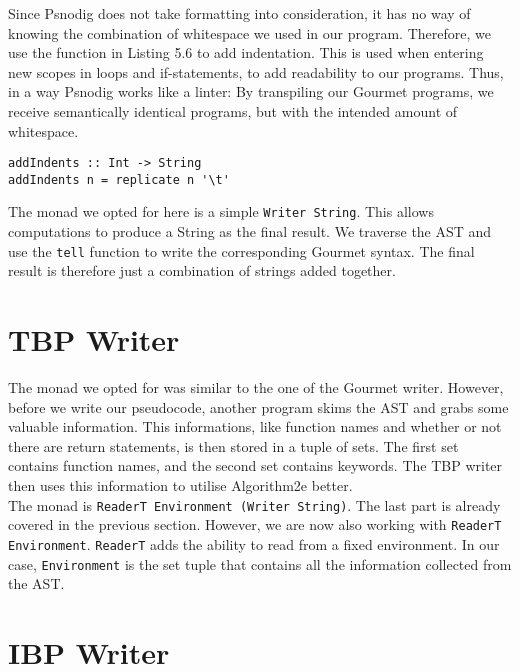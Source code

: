 Since Psnodig does not take formatting into consideration, it has no way of knowing the combination of whitespace we used in our program. Therefore, we use the function in Listing 5.6 to add indentation. This is used when entering new scopes in loops and if-statements, to add readability to our programs. Thus, in a way Psnodig works like a linter: By transpiling our Gourmet programs, we receive semantically identical programs, but with the intended amount of whitespace. \hfill \\

\begin{lstlisting}[caption={A function for adding indentation}, captionpos=b]
addIndents :: Int -> String
addIndents n = replicate n '\t'
\end{lstlisting}

The monad we opted for here is a simple \texttt{Writer String}. This allows computations to produce a String as the final result. We traverse the AST and use the \texttt{tell} function to write the corresponding Gourmet syntax. The final result is therefore just a combination of strings added together.

\section{TBP Writer}

The monad we opted for was similar to the one of the Gourmet writer. However, before we write our pseudocode, another program skims the AST and grabs some valuable information. This informations, like function names and whether or not there are return statements, is then stored in a tuple of sets. The first set contains function names, and the second set contains keywords. The TBP writer then uses this information to utilise Algorithm2e better. \hfill \\

The monad is \texttt{ReaderT Environment (Writer String)}. The last part is already covered in the previous section. However, we are now also working with \texttt{ReaderT Environment}. \texttt{ReaderT} adds the ability to read from a fixed environment. In our case, \texttt{Environment} is the set tuple that contains all the information collected from the AST.

\section{IBP Writer}

